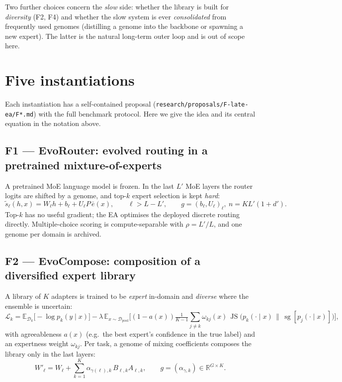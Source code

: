 \documentclass[11pt,a4paper]{article}
\theoremstyle{definition}
\theoremstyle{plain}
\theoremstyle{remark}
\newcommand{\R}{\mathbb{R}}
\newcommand{\E}{\mathbb{E}}
\newcommand{\Dist}{\mathcal{D}}
\newcommand{\JS}{\operatorname{JS}}
\newcommand{\sg}{\operatorname{sg}}
\begin{document}
Two further choices concern the \emph{slow} side: whether the library is built for \emph{diversity} (F2, F4) and whether the slow system is ever \emph{consolidated} from frequently used genomes (distilling a genome into the backbone or spawning a new expert). The latter is the natural long-term outer loop and is out of scope here.

\section{Five instantiations}
\label{sec:instances}

Each instantiation has a self-contained proposal (\texttt{research/proposals/F-late-ea/F*.md}) with the full benchmark protocol. Here we give the idea and its central equation in the notation above.

\subsection*{F1 --- EvoRouter: evolved routing in a pretrained mixture-of-experts}
A pretrained MoE language model is frozen. In the last $L'$ MoE layers the router logits are shifted by a genome, and top-$k$ expert selection is kept \emph{hard}:
\begin{equation}
\tilde s_\ell(h,x) = W_\ell h + b_\ell + U_\ell P\,\bar e(x),\qquad \ell > L-L',\qquad g = (b_\ell, U_\ell)_\ell,\ n = KL'(1+d').
\end{equation}
Top-$k$ has no useful gradient; the EA optimises the deployed discrete routing directly. Multiple-choice scoring is compute-separable with $\rho = L'/L$, and one genome per domain is archived.

\subsection*{F2 --- EvoCompose: composition of a diversified expert library}
A library of $K$ adapters is trained to be \emph{expert} in-domain and \emph{diverse} where the ensemble is uncertain:
\begin{equation}
\mathcal{L}_k = \E_{\Dist_k}\big[-\log p_k(y\mid x)\big] - \lambda\,\E_{x\sim\Dist_{\text{pool}}}\Big[(1-a(x))\tfrac{1}{K-1}\textstyle\sum_{j\neq k}\omega_{kj}(x)\,\JS\big(p_k(\cdot\mid x)\,\|\,\sg[p_j(\cdot\mid x)]\big)\Big],
\end{equation}
with agreeableness $a(x)$ (e.g.\ the best expert's confidence in the true label) and an expertness weight $\omega_{kj}$. Per task, a genome of mixing coefficients composes the library only in the last layers:
\begin{equation}
W'_\ell = W_\ell + \textstyle\sum_{k=1}^K \alpha_{\gamma(\ell),k}\,B_{\ell,k}A_{\ell,k},\qquad g = (\alpha_{\gamma,k}) \in\R^{G\times K}.
\end{equation}
\end{document}
